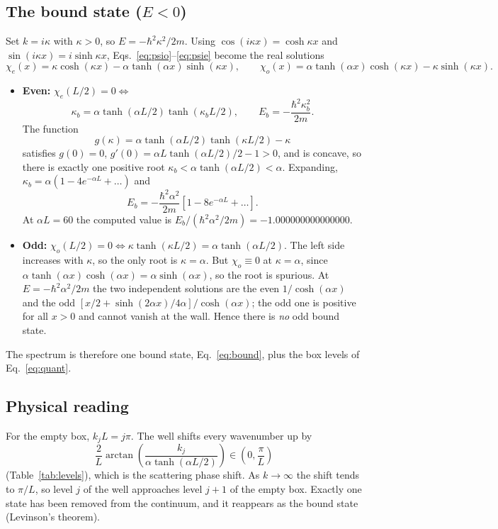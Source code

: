 \documentclass[11pt]{article}
\numberwithin{equation}{section}
\begin{document}
\subsection{The bound state (\texorpdfstring{$E<0$}{E < 0})}
Set $k=i\kappa$ with $\kappa>0$, so $E=-\hbar^2\kappa^2/2m$. Using $\cos(i\kappa x)=\cosh\kappa x$ and $\sin(i\kappa x)=i\sinh\kappa x$, Eqs.~\eqref{eq:psio}--\eqref{eq:psie} become the real solutions
\begin{equation}
\chi_e(x)=\kappa\cosh(\kappa x)-\alpha\tanh(\alpha x)\sinh(\kappa x),\qquad
\chi_o(x)=\alpha\tanh(\alpha x)\cosh(\kappa x)-\kappa\sinh(\kappa x).
\end{equation}
\begin{itemize}[itemsep=2pt]
\item \textbf{Even:} $\chi_e(L/2)=0\iff$
\begin{equation}
\boxed{\;\kappa_b=\alpha\tanh(\alpha L/2)\tanh(\kappa_bL/2),\qquad E_b=-\frac{\hbar^2\kappa_b^2}{2m}.\;}
\label{eq:bound}
\end{equation}
The function
\[
g(\kappa)=\alpha\tanh(\alpha L/2)\tanh(\kappa L/2)-\kappa
\]
satisfies $g(0)=0$, $g'(0)=\alpha L\tanh(\alpha L/2)/2-1>0$, and is concave, so there is exactly one positive root $\kappa_b<\alpha\tanh(\alpha L/2)<\alpha$. Expanding, $\kappa_b=\alpha(1-4e^{-\alpha L}+\dots)$ and
\begin{equation}
E_b=-\frac{\hbar^2\alpha^2}{2m}\left[1-8e^{-\alpha L}+\dots\right].
\end{equation}
At $\alpha L=60$ the computed value is $E_b/(\hbar^2\alpha^2/2m)=-1.000000000000000$.
\item \textbf{Odd:} $\chi_o(L/2)=0\iff\kappa\tanh(\kappa L/2)=\alpha\tanh(\alpha L/2)$. The left side increases with $\kappa$, so the only root is $\kappa=\alpha$. But $\chi_o\equiv0$ at $\kappa=\alpha$, since $\alpha\tanh(\alpha x)\cosh(\alpha x)=\alpha\sinh(\alpha x)$, so the root is spurious. At $E=-\hbar^2\alpha^2/2m$ the two independent solutions are the even $1/\cosh(\alpha x)$ and the odd $[x/2+\sinh(2\alpha x)/4\alpha]/\cosh(\alpha x)$; the odd one is positive for all $x>0$ and cannot vanish at the wall. Hence there is \emph{no} odd bound state.
\end{itemize}
The spectrum is therefore one bound state, Eq.~\eqref{eq:bound}, plus the box levels of Eq.~\eqref{eq:quant}.

\subsection{Physical reading}
For the empty box, $k_jL=j\pi$. The well shifts every wavenumber up by
\[
\frac{2}{L}\arctan\!\left(\frac{k_j}{\alpha\tanh(\alpha L/2)}\right)\in\left(0,\frac{\pi}{L}\right)
\]
(Table~\ref{tab:levels}), which is the scattering phase shift. As $k\to\infty$ the shift tends to $\pi/L$, so level $j$ of the well approaches level $j+1$ of the empty box. Exactly one state has been removed from the continuum, and it reappears as the bound state (Levinson's theorem).
\end{document}
